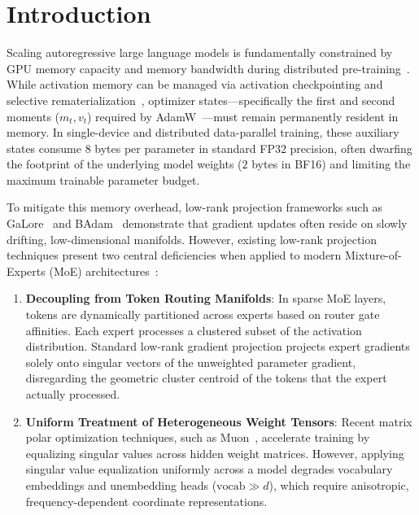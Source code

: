 \documentclass[10pt,twocolumn,letterpaper]{article}
\begin{document}
\begin{abstract}
to $0.1118$\,B/p ($3.78$\,MB vs.\ $135.21$\,MB) and preserving $N=12$ continuation equivalence within $\pm 0.01$ nats ($p_{\text{TOST}} = 1.52 \times 10^{-7}$).
\end{abstract}

\section{Introduction}

Scaling autoregressive large language models is fundamentally constrained by GPU memory capacity and memory bandwidth during distributed pre-training~\cite{kaplan2020scaling,radford2019language}. While activation memory can be managed via activation checkpointing and selective rematerialization~\cite{chen2016training}, optimizer states---specifically the first and second moments ($m_t, v_t$) required by AdamW~\cite{loshchilov2017decoupled,kingma2014adam}---must remain permanently resident in memory. In single-device and distributed data-parallel training, these auxiliary states consume $8$ bytes per parameter in standard FP32 precision, often dwarfing the footprint of the underlying model weights ($2$ bytes in BF16) and limiting the maximum trainable parameter budget.

To mitigate this memory overhead, low-rank projection frameworks such as GaLore~\cite{zhao2024galore} and BAdam~\cite{liu2024badam} demonstrate that gradient updates often reside on slowly drifting, low-dimensional manifolds. However, existing low-rank projection techniques present two central deficiencies when applied to modern Mixture-of-Experts (MoE) architectures~\cite{shazeer2017outrageously,fedus2022switch,jiang2024mixtral,deepseek2024v3}:
\begin{enumerate}
    \item \textbf{Decoupling from Token Routing Manifolds}: In sparse MoE layers, tokens are dynamically partitioned across experts based on router gate affinities. Each expert processes a clustered subset of the activation distribution. Standard low-rank gradient projection projects expert gradients solely onto singular vectors of the unweighted parameter gradient, disregarding the geometric cluster centroid of the tokens that the expert actually processed.
    \item \textbf{Uniform Treatment of Heterogeneous Weight Tensors}: Recent matrix polar optimization techniques, such as Muon~\cite{jordan2024muon}, accelerate training by equalizing singular values across hidden weight matrices. However, applying singular value equalization uniformly across a model degrades vocabulary embeddings and unembedding heads ($\text{vocab} \gg d$), which require anisotropic, frequency-dependent coordinate representations.
\end{enumerate}
\end{document}
